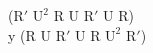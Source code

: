($\text{R}'$ $\text{U}^2$ R U $\text{R}'$ U R)\\
y (R U $\text{R}'$ U R $\text{U}^2$ $\text{R}'$)\\
